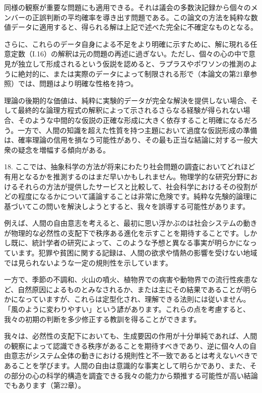 \documentclass[a4paper,11pt,openany]{ltjsbook}
\begin{document}
同様の観察が重要な問題にも適用できる。それは議会の多数決記録から個々のメンバーの正誤判断の平均確率を導き出す問題である。この論文の方法を純粋な数値データに適用すると、得られる解は上記で述べた完全に不確定なものとなる。

さらに、これらのデータ自身による不足をより明確に示すために、解に現れる任意定数（I.16）の解釈は元の問題の再述に過ぎない。ただし、個々の心の中で意見が独立して形成されるという仮説を認めると、ラプラスやポワソンの推測のように絶対的に、または実際のデータによって制限される形で（本論文の第21章参照）では、問題はより明確な性格を持つ。

理論の後期的な価値は、純粋に実験的データが完全な解決を提供しない場合、そして最終的な論理方程式の解釈によって示されるさらなる経験が得られない場合、そのような中間的な仮説の正確な形成に大きく依存すること明確になるだろう。一方で、人間の知識を超えた性質を持つ主題において過度な仮説形成の準備は、確率理論の信用を損なう可能性があり、その最も正当な結論に対する一般大衆の疑念を増幅する傾向がある。

18. ここでは、抽象科学の方法が将来にわたり社会問題の調査においてどれほど有用となるかを推測するのはまだ早いかもしれません。物理学的な研究分野におけるそれらの方法が提供したサービスと比較して、社会科学におけるその役割がどの程度になるかについて議論することは非常に危険です。純粋な先験的論理に基づいてこの問いを解決しようとすると、我々を誤導する可能性があります。

例えば、人間の自由意志を考えると、最初に思い浮かぶのは社会システムの動きが物理的な必然性の支配下で秩序ある進化を示すことを期待することです。しかし既に、統計学者の研究によって、このような予想と異なる事実が明らかになっています。犯罪や貧困に関する記録は、人間の欲求や情熱の影響を受けない地域では見られないような一定の規則性を示しています。

一方で、季節の不調和、火山の噴火、植物界での病害や動物界での流行性疾患など、自然原因によるものとみなされるか、または主にその結果であることが明らかになっていますが、これらは定型化され、理解できる法則には従いません。「風のように変わりやすい」という諺があります。これらの点を考慮すると、我々の初期の判断を多少修正する教訓を得ることができます。

我々は、必然性の支配下においても、生成要因の作用が十分単純であれば、人間の観察によって認識できる秩序があることを期待すべきであり、逆に個々人の自由意志がシステム全体の動きにおける規則性と不一致であるとは考えないべきであることを学びます。人間の自由は意識的な事実として明らかであり、また、その部分の心の科学的構造を調査できる我々の能力から類推する可能性が高い結論でもあります（第22章）。
\end{document}
